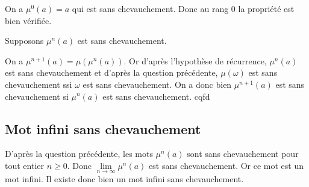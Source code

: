 On a $\mu^0(a) = a$ qui est sans chevauchement. Donc au rang $0$ la propriété est bien vérifiée.

Supposons $\mu^n(a)$ est sans chevauchement.

On a $\mu^{n+1}(a) = \mu(\mu^{n}(a))$. Or d'après l'hypothèse de récurrence, $\mu^n(a)$ est sans chevauchement et d'après la question précédente, $\mu(\omega)$ est sans chevauchement ssi $\omega$ est sans chevauchement. On a donc bien $\mu^{n+1}(a)$ est sans chevauchement si $\mu^{n}(a)$ est sans chevauchement.
cqfd

\subsection{Mot infini sans chevauchement}
D'après la question précédente, les mots $\mu^n(a)$ sont sans chevauchement pour tout entier $n \geq 0$.
Donc $\lim\limits_{n \to \infty}\mu^n(a)$ est sans chevauchement. Or ce mot est un mot infini. Il existe donc bien un mot infini sans chevauchement.


%
%
%
%
%
%
%
%
%


